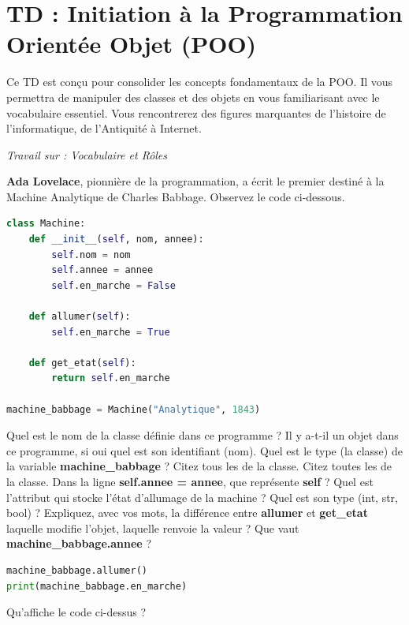\section*{TD : Initiation à la Programmation Orientée Objet (POO)}

\begin{Comprendre}
Ce TD est conçu pour consolider les concepts fondamentaux de la POO. Il vous permettra de manipuler des classes et des objets en vous familiarisant avec le vocabulaire essentiel. Vous rencontrerez des figures marquantes de l'histoire de l'informatique, de l'Antiquité à Internet.
\end{Comprendre}

\begin{Exercise}[title=La Machine Analytique d'Ada Lovelace (1843)]
\begin{center}
    \textit{Travail sur : Vocabulaire et Rôles}
\end{center}

\textbf{Ada Lovelace}, pionnière de la programmation, a écrit le premier  destiné à la Machine Analytique de Charles Babbage.
Observez le code ci-dessous.

\begin{lstlisting}[language=Python]
class Machine:
    def __init__(self, nom, annee):
        self.nom = nom
        self.annee = annee
        self.en_marche = False

    def allumer(self):
        self.en_marche = True
    
    def get_etat(self):
        return self.en_marche

machine_babbage = Machine("Analytique", 1843)
\end{lstlisting}

\Question Quel est le nom de la classe définie dans ce programme ?
\Question Il y a-t-il un objet dans ce programme, si oui quel est son identifiant (nom).
\Question Quel est le type (la classe) de la variable \textbf{machine\_babbage} ?
\Question Citez tous les  de la classe.
\Question Citez toutes les  de la classe.
\Question Dans la ligne \textbf{self.annee = annee}, que représente \textbf{self} ?
\Question Quel est l'attribut qui stocke l'état d'allumage de la machine ? Quel est son type (int, str, bool) ?
\Question Expliquez, avec vos mots, la différence entre \textbf{allumer} et \textbf{get\_etat} laquelle modifie l'objet, laquelle renvoie la valeur ?
\Question Que vaut \textbf{machine\_babbage.annee} ?
\begin{lstlisting}[language=Python]
machine_babbage.allumer()
print(machine_babbage.en_marche)
\end{lstlisting}
\Question Qu'affiche le code ci-dessus ?
\end{Exercise}

